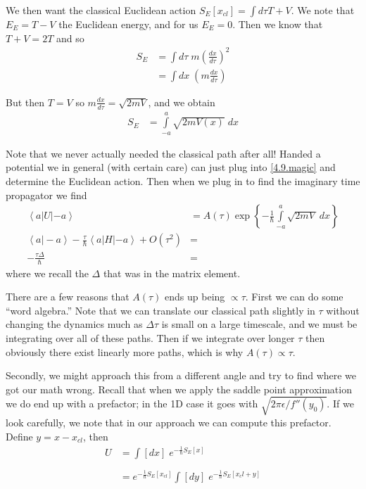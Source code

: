 \documentclass[10pt]{report}
\newcommand{\bra}[1]{\left<#1\right|}
\newcommand{\ket}[1]{\left|#1\right>}
\newcommand{\dotp}[2]{\left<#1\left.\right|#2\right>}
\newcommand{\rd}[2]{\frac{d#1}{d#2}}
\begin{document}
We then want the classical Euclidean action $S_E[x_{cl}] = \int d\tau T + V$. We note that $E_E = T-V$ the Euclidean energy, and for us $E_E = 0$. Then we know that $T+V = 2T$ and so
\begin{align}
    S_E &= \int d\tau \;m\left( \rd{x}{\tau} \right)^2 \\
    &= \int dx\; \left( m\rd{x}{\tau} \right)
\end{align}

But then $T=V$ so $m\rd{x}{\tau} = \sqrt{2mV}$, and we obtain
\begin{align}
    S_E &= \int\limits_{-a}^a \sqrt{2mV(x)}\; dx\label{4.9.magic}
\end{align}

Note that we never actually needed the classical path after all! Handed a potential we in general (with certain care) can just plug into \eqref{4.9.magic} and determine the Euclidean action. Then when we plug in to find the imaginary time propagator we find
\begin{align}
    \bra{a}U\ket{-a} &= A(\tau)\exp\left\{ -\frac{1}{\hbar}\int\limits_{-a}^{a}\sqrt{2mV}\;dx \right\}\\
    \dotp{a}{-a} - \frac{\tau}{\hbar}\bra{a}H\ket{-a} + O(\tau^2) &=\\
    -\frac{\tau\Delta}{\hbar} &=
\end{align}
where we recall the $\Delta$ that was in the matrix element.

There are a few reasons that $A(\tau)$ ends up being $\propto \tau$. First we can do some ``word algebra.'' Note that we can translate our classical path slightly in $\tau$ without changing the dynamics much as $\Delta \tau$ is small on a large timescale, and we must be integrating over all of these paths. Then if we integrate over longer $\tau$ then obviously there exist linearly more paths, which is why $A(\tau)\propto\tau$.

Secondly, we might approach this from a different angle and try to find where we got our math wrong. Recall that when we apply the saddle point approximation we do end up with a prefactor; in the 1D case it goes with $\sqrt{2\pi \epsilon/f''(y_0)}$. If we look carefully, we note that in our approach we can compute this prefactor. Define $y = x - x_{cl}$, then
\begin{align}
    U &= \int\limits_{}^{}[dx]\;e^{-\frac{1}{\hbar}S_E[x]}\\
    &= e^{-\frac{1}{\hbar}S_E[x_{cl}]}\int\limits_{}^{}[dy]\;e^{-\frac{1}{\hbar}S_E[x_cl + y]}
\end{align}
\end{document}
